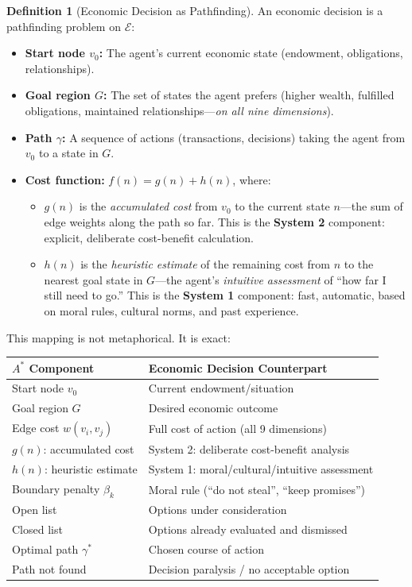 \documentclass[12pt]{article}
\theoremstyle{definition}
\newtheorem{definition}[theorem]{Definition}
\theoremstyle{remark}
\newcommand{\E}{\mathcal{E}}               %
\begin{document}
\begin{definition}[Economic Decision as Pathfinding]
An economic decision is a pathfinding problem on $\E$:
\begin{itemize}
    \item \textbf{Start node $v_0$:} The agent's current economic state (endowment, obligations, relationships).
    \item \textbf{Goal region $G$:} The set of states the agent prefers (higher wealth, fulfilled obligations, maintained relationships---\emph{on all nine dimensions}).
    \item \textbf{Path $\gamma$:} A sequence of actions (transactions, decisions) taking the agent from $v_0$ to a state in $G$.
    \item \textbf{Cost function:} $f(n) = g(n) + h(n)$, where:
    \begin{itemize}
        \item $g(n)$ is the \emph{accumulated cost} from $v_0$ to the current state $n$---the sum of edge weights along the path so far.  This is the \textbf{System 2} component: explicit, deliberate cost-benefit calculation.
        \item $h(n)$ is the \emph{heuristic estimate} of the remaining cost from $n$ to the nearest goal state in $G$---the agent's \emph{intuitive assessment} of ``how far I still need to go.''  This is the \textbf{System 1} component: fast, automatic, based on moral rules, cultural norms, and past experience.
    \end{itemize}
\end{itemize}
\end{definition}

This mapping is not metaphorical.  It is exact:

\begin{center}
\begin{tabular}{ll}
\toprule
\textbf{$A^*$ Component} & \textbf{Economic Decision Counterpart} \\
\midrule
Start node $v_0$ & Current endowment/situation \\
Goal region $G$ & Desired economic outcome \\
Edge cost $w(v_i, v_j)$ & Full cost of action (all 9 dimensions) \\
$g(n)$: accumulated cost & System 2: deliberate cost-benefit analysis \\
$h(n)$: heuristic estimate & System 1: moral/cultural/intuitive assessment \\
Boundary penalty $\beta_k$ & Moral rule (``do not steal'', ``keep promises'') \\
Open list & Options under consideration \\
Closed list & Options already evaluated and dismissed \\
Optimal path $\gamma^*$ & Chosen course of action \\
Path not found & Decision paralysis / no acceptable option \\
\bottomrule
\end{tabular}
\end{center}
\end{document}
